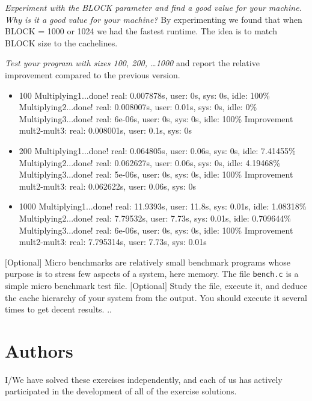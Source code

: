 \documentclass{article}
\begin{document}
\begin{ExerciseList}
\Question
\emph{Experiment with the BLOCK parameter and find a good value for
  your machine. Why is it a good value for your machine?}
\Answer By experimenting we found that when BLOCK = 1000 or 1024 we had the fastest runtime. 
The idea is to match BLOCK size to the cachelines.

\Question
\emph{Test your program with sizes 100, 200, \dots 1000} and report
the relative improvement compared to the previous version.
\Answer 
\begin{itemize}

\item 100
\subitem Multiplying1...done!	real: 0.007878s, user: 0s, sys: 0s, idle: 100\%
\subitem Multiplying2...done!	real: 0.008007s, user: 0.01s, sys: 0s, idle: 0\%
\subitem Multiplying3...done!	real: 6e-06s, user: 0s, sys: 0s, idle: 100\%
\subitem Improvement mult2-mult3: real: 0.008001s, user: 0.1s, sys: 0s

\item 200
\subitem Multiplying1...done!	real: 0.064805s, user: 0.06s, sys: 0s, idle: 7.41455\%
\subitem Multiplying2...done!	real: 0.062627s, user: 0.06s, sys: 0s, idle: 4.19468\%
\subitem Multiplying3...done!	real: 5e-06s, user: 0s, sys: 0s, idle: 100\%
\subitem Improvement mult2-mult3: real: 0.062622s, user: 0.06s, sys: 0s

\item 1000
\subitem Multiplying1...done!	real: 11.9393s, user: 11.8s, sys: 0.01s, idle: 1.08318\%
\subitem Multiplying2...done!	real: 7.79532s, user: 7.73s, sys: 0.01s, idle: 0.709644\%
\subitem Multiplying3...done!	real: 6e-06s, user: 0s, sys: 0s, idle: 100\%
\subitem Improvement mult2-mult3: real: 7.795314s, user: 7.73s, sys: 0.01s


\end{itemize}

\Exercise $[$Optional$]$ Micro benchmarks are relatively small
benchmark programs whose purpose is to stress few aspects of a
system, here memory. The file \texttt{bench.c} is a simple micro
benchmark test file.
\Question $[$Optional$]$
Study the file, execute it, and deduce the cache hierarchy of your
system from the output. You should execute it several times to get
decent results.
\Answer .. %

\end{ExerciseList}

\newpage
\section{Authors}
I/We have solved these exercises independently, and each of us has actively
participated in the development of all of the exercise solutions.
\vspace{1cm}
\end{document}
